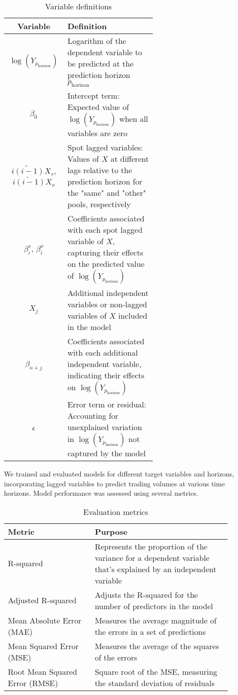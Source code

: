\documentclass{article}
\begin{document}
  \begin{table}[h!]
    \centering
    \begin{tabular}{|c|p{0.6\linewidth}|}
    \hline
    \textbf{Variable} & \textbf{Definition} \\
    \hline
    \(\log(Y_{p_{\text{horizon}}})\) & Logarithm of the dependent variable to be predicted at the prediction horizon \(p_{\text{horizon}}\) \\
    \(\beta_0\) & Intercept term: Expected value of \(\log(Y_{p_{\text{horizon}}})\) when all variables are zero \\
    \(\widetilde{i(i-1)}X_s\), \(\widetilde{i(i-1)}X_o\) & Spot lagged variables: Values of \(X\) at different lags relative to the prediction horizon for the "same" and "other" pools, respectively \\
    \(\beta_i^s\), \(\beta_i^o\) & Coefficients associated with each spot lagged variable of \(X\), capturing their effects on the predicted value of \(\log(Y_{p_{\text{horizon}}})\) \\
    \(X_j\) & Additional independent variables or non-lagged variables of \(X\) included in the model \\
    \(\beta_{n+j}\) & Coefficients associated with each additional independent variable, indicating their effects on \(\log(Y_{p_{\text{horizon}}})\) \\
    \(\epsilon\) & Error term or residual: Accounting for unexplained variation in \(\log(Y_{p_{\text{horizon}}})\) not captured by the model \\
    \hline
    \end{tabular}
    \caption{Variable definitions}
    \label{tab:variables}
  \end{table}

We trained and evaluated models for different target variables and horizons, incorporating lagged variables to predict trading volumes at various time horizons. Model performance was assessed using several metrics.

\begin{table}[h!]
  \centering
  \begin{tabular}{|p{0.35\linewidth}|p{0.55\linewidth}|}
  \hline
  \textbf{Metric} & \textbf{Purpose} \\
  \hline
  R-squared & Represents the proportion of the variance for a dependent variable that's explained by an independent variable \\
  Adjusted R-squared & Adjusts the R-squared for the number of predictors in the model \\
  Mean Absolute Error (MAE) & Measures the average magnitude of the errors in a set of predictions \\
  Mean Squared Error (MSE) & Measures the average of the squares of the errors \\
  Root Mean Squared Error (RMSE) & Square root of the MSE, measuring the standard deviation of residuals \\
  \hline
  \end{tabular}
  \caption{Evaluation metrics}
  \label{tab:metrics}
  \end{table}  
\end{document}

